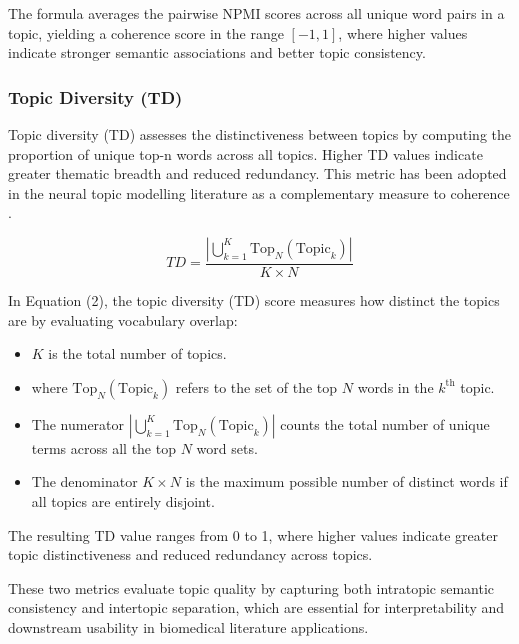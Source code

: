 \documentclass[utf8]{FrontiersinHarvard}
\begin{document}
The formula averages the pairwise NPMI scores across all unique word pairs in a topic, yielding a coherence score in the range $[-1, 1]$, where higher values indicate stronger semantic associations and better topic consistency.

\subsubsection{Topic Diversity (TD)}

Topic diversity (TD) assesses the distinctiveness between topics by computing the proportion of unique top-n words across all topics. Higher TD values indicate greater thematic breadth and reduced redundancy. This metric has been adopted in the neural topic modelling literature as a complementary measure to coherence \citep{dieng_topic_2020}.

\begin{equation}
TD = \frac{\left|\bigcup_{k=1}^{K} \text{Top}_N(\text{Topic}_k)\right|}{K \times N}
\end{equation}

In Equation (2), the topic diversity (TD) score measures how distinct the topics are by evaluating vocabulary overlap:

\begin{itemize}
    \item $K$ is the total number of topics.

    \item where $\text{Top}_N(\text{Topic}_k)$ refers to the set of the top $N$ words in the $k^{\text{th}}$ topic.

    \item The numerator $\left|\bigcup_{k=1}^{K} \text{Top}_N(\text{Topic}_k)\right|$ counts the total number of unique terms across all the top $N$ word sets.

    \item The denominator $K \times N$ is the maximum possible number of distinct words if all topics are entirely disjoint.
\end{itemize}

The resulting TD value ranges from 0 to 1, where higher values indicate greater topic distinctiveness and reduced redundancy across topics.

These two metrics evaluate topic quality by capturing both intratopic semantic consistency and intertopic separation, which are essential for interpretability and downstream usability in biomedical literature applications.
\end{document}
